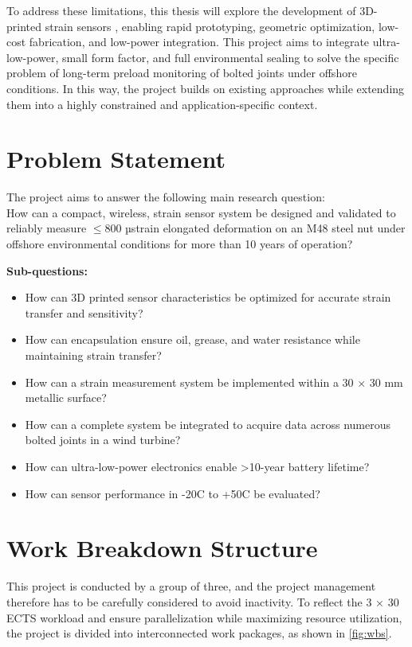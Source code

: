 To address these limitations, this thesis will explore the development of 3D-printed strain sensors \cite{G.O.A.T, 3DprintStrain, 3DprintWheatstoneStrain}, enabling rapid prototyping, geometric optimization, low-cost fabrication, and low-power integration.
This project aims to integrate ultra-low-power, small form factor, and full environmental sealing to solve the specific problem of long-term preload monitoring of bolted joints under offshore conditions. In this way, the project builds on existing approaches while extending them into a highly constrained and application-specific context.


\section*{Problem Statement}
The project aims to answer the following main research question:\\
How can a compact, wireless, strain sensor system be designed and validated to reliably measure $\le$800 µstrain elongated deformation on an M48 steel nut under offshore environmental conditions for more than 10 years of operation?

\pagebreak
\textbf{Sub-questions:}
\begin{itemize}
    \item[-] How can 3D printed sensor characteristics be optimized for accurate strain transfer and sensitivity?
    \item[-] How can encapsulation ensure oil, grease, and water resistance while maintaining strain transfer?
    \item[-] How can a strain measurement system be implemented within a 30 × 30 mm metallic surface?
    \item[-] How can a complete system be integrated to acquire data across numerous bolted joints in a wind turbine?
    \item[-] How can ultra-low-power electronics enable >10-year battery lifetime?
    \item[-] How can sensor performance in -20\textdegree C to +50\textdegree C be evaluated?
\end{itemize}

\section*{Work Breakdown Structure}
This project is conducted by a group of three, and the project management therefore has to be carefully considered to avoid inactivity. To reflect the 3 × 30 ECTS workload and ensure parallelization while maximizing resource utilization, the project is divided into interconnected work packages, as shown in \cref{fig:wbs}.

